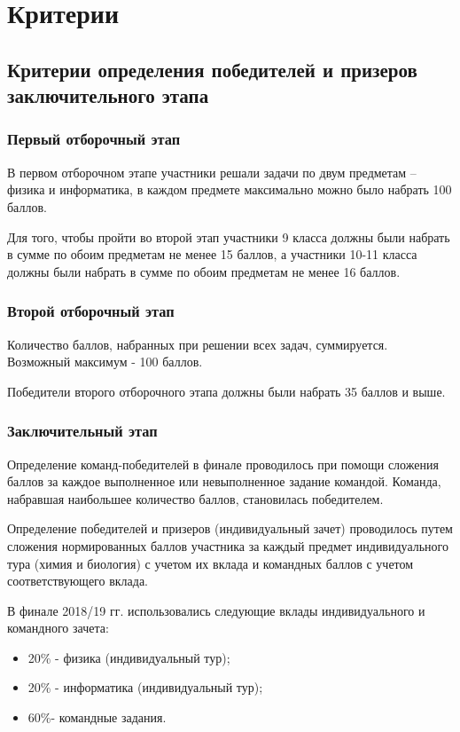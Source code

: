 \part{Критерии}
\chapter{Критерии определения победителей и призеров заключительного этапа}

\section{Первый отборочный этап}
 
В первом отборочном этапе участники решали задачи по двум предметам – физика и информатика, в каждом предмете максимально можно было набрать 100 баллов.

Для того, чтобы пройти во второй этап участники 9 класса должны были набрать в сумме по обоим предметам не менее 15 баллов, а участники 10-11 класса должны были набрать в сумме по обоим предметам не менее 16 баллов.

\section{Второй отборочный этап}

Количество баллов, набранных при решении всех задач, суммируется. Возможный максимум - 100 баллов.

Победители второго отборочного этапа должны были набрать 35 баллов и выше.

\section{Заключительный этап}

Определение команд-победителей в финале проводилось при помощи сложения баллов за каждое выполненное или невыполненное задание командой. Команда, набравшая наибольшее количество баллов, становилась победителем. 

Определение победителей и призеров (индивидуальный зачет) проводилось путем сложения нормированных баллов участника за каждый предмет индивидуального тура (химия и биология) с учетом их вклада и командных баллов с учетом соответствующего вклада.

В финале 2018/19 гг. использовались следующие вклады индивидуального и командного зачета: 
\begin{itemize}
    \item 20\% - физика (индивидуальный тур);  
    \item 20\% - информатика (индивидуальный тур);  
    \item 60\%- командные задания. 
\end{itemize}

